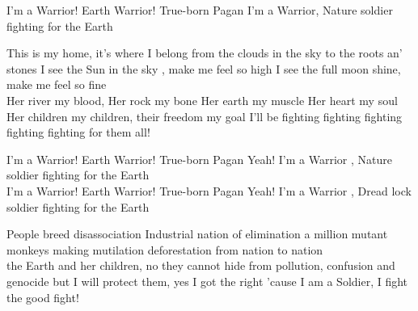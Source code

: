 \beginverse*
I'm a Warrior! Earth Warrior!
True-born Pagan I'm a Warrior,
Nature soldier fighting for the Earth
\endverse

\beginverse
This is my home, it's where I belong
from the clouds in the sky to the roots an' stones
I see the Sun in the sky , make me feel so high
I see the full moon shine, make me feel so fine
~\\
Her river my blood, Her rock my bone
Her earth my muscle Her heart my soul
Her children my children, their freedom my goal
I'll be fighting fighting fighting fighting fighting for them all!
\endverse

\beginchorus
I'm a Warrior! Earth Warrior!
True-born Pagan Yeah! I'm a Warrior ,
Nature soldier fighting for the Earth
~\\
I'm a Warrior! Earth Warrior!
True-born Pagan Yeah! I'm a Warrior ,
Dread lock soldier fighting for the Earth
\endchorus

\beginverse
People breed disassociation
Industrial nation of elimination
a million mutant monkeys making mutilation
deforestation from nation to nation
~\\
the Earth and her children, no they cannot hide
from pollution, confusion and genocide
but I will protect them, yes I got the right
'cause I am a Soldier, I fight the good fight!
\endverse

\endsong